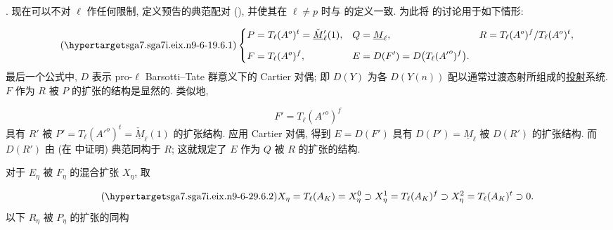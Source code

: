 

\medskip
\noindent
{}. 现在可以不对 $\ell$ 作任何限制, 定义预告的典范配对 (), 并使其在 $\ell\neq p$ 时与  的定义一致. 为此将  的讨论用于如下情形:

\begin{equation}\tag{\SGARefTarget{sga7.sga7i.eix.n9-6-1}{9.6.1}}
\left\{
\begin{aligned}
P&=T_\ell(A^o)^t=\check{\underline M}{}'_\ell(1),
& Q&=\underline M_\ell,
& R&=T_\ell(A^o)^f/T_\ell(A^o)^t,\\[1.25ex]
F&=T_\ell(A^o)^f,
& E&=D(F')=D\bigl(T_\ell({A'}^o)^f\bigr).
\end{aligned}
\right.
\end{equation}
最后一个公式中, $D$ 表示 pro-$\ell$ Barsotti--Tate 群意义下的 Cartier 对偶; 即 $D(Y)$ 为各 $D(Y(n))$ 配以通常过渡态射所组成的\underline{投射}系统. $F$ 作为 $R$ 被 $P$ 的扩张的结构是显然的. 类似地,

\begin{equation*}
F'=T_\ell({A'}^o)^f
\end{equation*}
具有 $R'$ 被 $P'=T_\ell({A'}^o)^t=\check{\underline M}_\ell(1)$ 的扩张结构. 应用 Cartier 对偶, 得到 $E=D(F')$ 具有 $D(P')=\underline M_\ell$ 被 $D(R')$ 的扩张结构. 而 $D(R')$ 由  (在  中证明) 典范同构于 $R$; 这就规定了 $E$ 作为 $Q$ 被 $R$ 的扩张的结构.

对于 $E_\eta$ 被 $F_\eta$ 的混合扩张 $X_\eta$, 取

\begin{equation}\tag{\SGARefTarget{sga7.sga7i.eix.n9-6-2}{9.6.2}}
X_\eta=T_\ell(A_K)=X^0_\eta
 \supset X^1_\eta=T_\ell(A_K)^f
 \supset X^2_\eta=T_\ell(A_K)^t
 \supset0.
\end{equation}
以下 $R_\eta$ 被 $P_\eta$ 的扩张的同构


